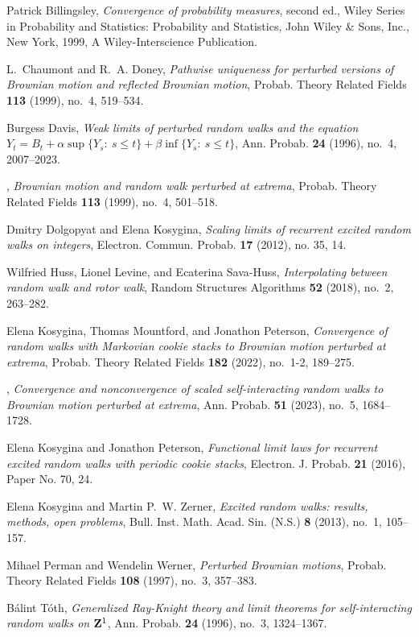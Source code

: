\documentclass[EJP]{ejpecp} %
\begin{document}
\begin{thebibliography}{10}

Patrick Billingsley, \emph{Convergence of probability measures}, second ed., Wiley Series in Probability and Statistics: Probability and Statistics, John Wiley \& Sons, Inc., New York, 1999, A Wiley-Interscience Publication. 

L.~Chaumont and R.~A. Doney, \emph{Pathwise uniqueness for perturbed versions of {B}rownian motion and reflected {B}rownian motion}, Probab. Theory Related Fields \textbf{113} (1999), no.~4, 519--534. 

Burgess Davis, \emph{Weak limits of perturbed random walks and the equation {$Y_t=B_t+\alpha\sup\{Y_s\colon\ s\leq t\}+\beta\inf\{Y_s\colon\ s\leq t\}$}}, Ann. Probab. \textbf{24} (1996), no.~4, 2007--2023. 

\bysame, \emph{Brownian motion and random walk perturbed at extrema}, Probab. Theory Related Fields \textbf{113} (1999), no.~4, 501--518. 

Dmitry Dolgopyat and Elena Kosygina, \emph{Scaling limits of recurrent excited random walks on integers}, Electron. Commun. Probab. \textbf{17} (2012), no. 35, 14. 

Wilfried Huss, Lionel Levine, and Ecaterina Sava-Huss, \emph{Interpolating between random walk and rotor walk}, Random Structures Algorithms \textbf{52} (2018), no.~2, 263--282. 

Elena Kosygina, Thomas Mountford, and Jonathon Peterson, \emph{Convergence of random walks with {M}arkovian cookie stacks to {B}rownian motion perturbed at extrema}, Probab. Theory Related Fields \textbf{182} (2022), no.~1-2, 189--275. 

\bysame, \emph{Convergence and nonconvergence of scaled self-interacting random walks to {B}rownian motion perturbed at extrema}, Ann. Probab. \textbf{51} (2023), no.~5, 1684--1728. 

Elena Kosygina and Jonathon Peterson, \emph{Functional limit laws for recurrent excited random walks with periodic cookie stacks}, Electron. J. Probab. \textbf{21} (2016), Paper No. 70, 24. 

Elena Kosygina and Martin P.~W. Zerner, \emph{Excited random walks: results, methods, open problems}, Bull. Inst. Math. Acad. Sin. (N.S.) \textbf{8} (2013), no.~1, 105--157. 

Mihael Perman and Wendelin Werner, \emph{Perturbed {B}rownian motions}, Probab. Theory Related Fields \textbf{108} (1997), no.~3, 357--383. 

B\'{a}lint T\'{o}th, \emph{Generalized {R}ay-{K}night theory and limit theorems for self-interacting random walks on {${\bf Z}^1$}}, Ann. Probab. \textbf{24} (1996), no.~3, 1324--1367. 

\end{thebibliography}
\end{document}
